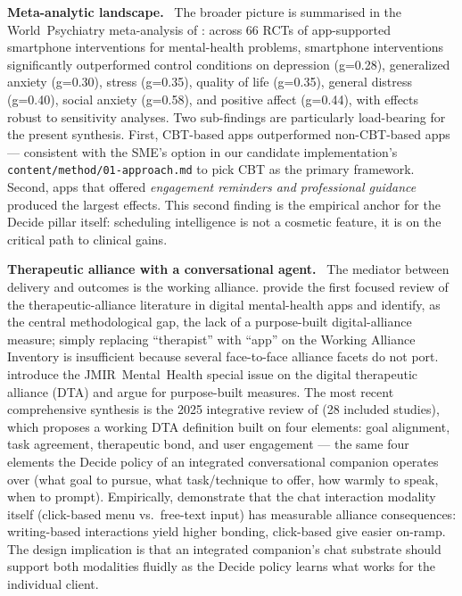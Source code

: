 \documentclass[10pt,conference]{article}
\renewcommand{\paragraph}[1]{\smallskip\par\noindent\textbf{#1}~\ignorespaces}
\begin{document}
\paragraph{Meta-analytic landscape.}
The broader picture is summarised in the World~Psychiatry meta-analysis
of \cite{Linardon2019Meta}: across 66 RCTs of app-supported smartphone
interventions for mental-health problems, smartphone interventions
significantly outperformed control conditions on depression (g=0.28),
generalized anxiety (g=0.30), stress (g=0.35), quality of life
(g=0.35), general distress (g=0.40), social anxiety (g=0.58), and
positive affect (g=0.44), with effects robust to sensitivity
analyses. Two sub-findings are particularly load-bearing for the
present synthesis. First, CBT-based apps outperformed non-CBT-based
apps --- consistent with the SME's option in our candidate
implementation's \texttt{content/method/01-approach.md} to pick CBT
as the primary framework. Second, apps that offered
\emph{engagement reminders and professional guidance} produced the
largest effects. This second finding is the empirical anchor for the
Decide pillar itself: scheduling intelligence is not a cosmetic
feature, it is on the critical path to clinical gains.

\paragraph{Therapeutic alliance with a conversational agent.}
The mediator between delivery and outcomes is the working alliance.
\cite{Henson2019DTA} provide the first focused review of the
therapeutic-alliance literature in digital mental-health apps and
identify, as the central methodological gap, the lack of a
purpose-built digital-alliance measure; simply replacing ``therapist''
with ``app'' on the Working Alliance Inventory is insufficient because
several face-to-face alliance facets do not port.
\cite{Lederman2021DTASpecialIssue} introduce the JMIR~Mental~Health
special issue on the digital therapeutic alliance (DTA) and argue for
purpose-built measures. The most recent comprehensive synthesis is the
2025 integrative review of \cite{MalouinLachance2025DTAReview} (28
included studies), which proposes a working DTA definition built on
four elements: goal alignment, task agreement, therapeutic bond, and
user engagement --- the same four elements the Decide policy of an
integrated conversational companion operates over (what goal to
pursue, what task/technique to offer, how warmly to speak, when to
prompt).
Empirically, \cite{Mai2022CoachbotInteraction} demonstrate that the
chat interaction modality itself (click-based menu vs.\ free-text
input) has measurable alliance consequences: writing-based
interactions yield higher bonding, click-based give easier on-ramp.
The design implication is that an integrated companion's chat
substrate should support both modalities fluidly as the Decide policy
learns what works for the individual client.
\end{document}
